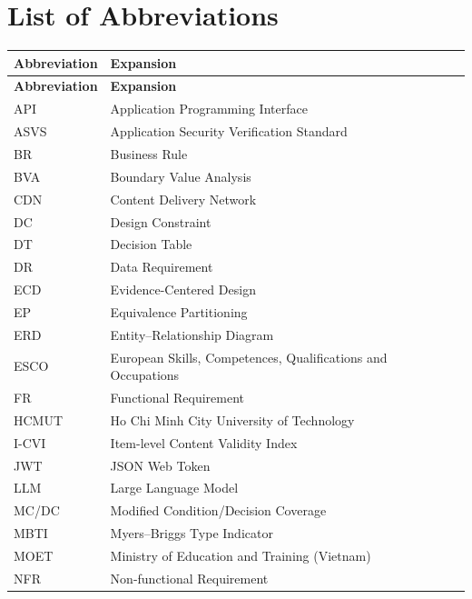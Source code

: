 \section*{List of Abbreviations}

{\small{}\renewcommand{\arraystretch}{1.1}
\begin{longtable}{|>{\raggedright\arraybackslash}p{}|>{\raggedright\arraybackslash}p{}|}
\hline
\textbf{Abbreviation} & \textbf{Expansion} \\ \hline
\endfirsthead
\hline
\textbf{Abbreviation} & \textbf{Expansion} \\ \hline
\endhead
API & Application Programming Interface \\ \hline
ASVS & Application Security Verification Standard \\ \hline
BR & Business Rule \\ \hline
BVA & Boundary Value Analysis \\ \hline
CDN & Content Delivery Network \\ \hline
DC & Design Constraint \\ \hline
DT & Decision Table \\ \hline
DR & Data Requirement \\ \hline
ECD & Evidence-\allowbreak{}Centered Design \\ \hline
EP & Equivalence Partitioning \\ \hline
ERD & Entity--Relationship Diagram \\ \hline
ESCO & European Skills, Competences, Qualifications and Occupations \\ \hline
FR & Functional Requirement \\ \hline
HCMUT & Ho Chi Minh City University of Technology \\ \hline
I-CVI & Item-level Content Validity Index \\ \hline
JWT & JSON Web Token \\ \hline
LLM & Large Language Model \\ \hline
MC/DC & Modified Condition/\allowbreak{}Decision Coverage \\ \hline
MBTI & Myers--Briggs Type Indicator \\ \hline
MOET & Ministry of Education and Training (Vietnam) \\ \hline
NFR & Non-\allowbreak{}functional Requirement \\ \hline

\end{longtable}}
